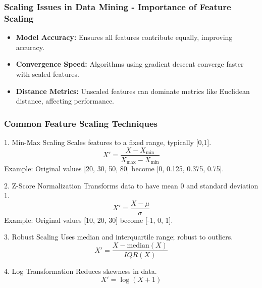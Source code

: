 \documentclass[aspectratio=169]{beamer}
\begin{document}
\begin{frame}[fragile]
    \frametitle{Scaling Issues in Data Mining - Importance of Feature Scaling}
    \begin{itemize}
        \item \textbf{Model Accuracy:} Ensures all features contribute equally, improving accuracy.
        \item \textbf{Convergence Speed:} Algorithms using gradient descent converge faster with scaled features.
        \item \textbf{Distance Metrics:} Unscaled features can dominate metrics like Euclidean distance, affecting performance.
    \end{itemize}
\end{frame}

\begin{frame}[fragile]
    \frametitle{Common Feature Scaling Techniques}
    \begin{block}{1. Min-Max Scaling}
        Scales features to a fixed range, typically [0,1].
        \begin{equation}
            X' = \frac{X - X_{\text{min}}}{X_{\text{max}} - X_{\text{min}}}
        \end{equation}
        Example: Original values [20, 30, 50, 80] become [0, 0.125, 0.375, 0.75].
    \end{block}

    \begin{block}{2. Z-Score Normalization}
        Transforms data to have mean 0 and standard deviation 1.
        \begin{equation}
            X' = \frac{X - \mu}{\sigma}
        \end{equation}
        Example: Original values [10, 20, 30] become [-1, 0, 1].
    \end{block}

    \begin{block}{3. Robust Scaling}
        Uses median and interquartile range; robust to outliers.
        \begin{equation}
            X' = \frac{X - \text{median}(X)}{IQR(X)}
        \end{equation}
    \end{block}

    \begin{block}{4. Log Transformation}
        Reduces skewness in data.
        \begin{equation}
            X' = \log(X + 1)
        \end{equation}
    \end{block}
\end{frame}
\end{document}

